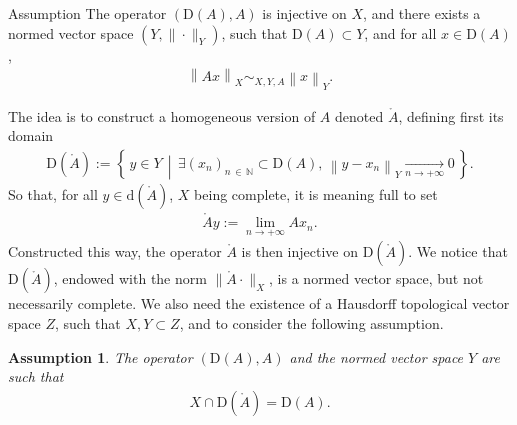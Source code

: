 \documentclass[AHL,Unicode,longabstracts,published]{cedram}
\newcommand{\bbN}{\mathbb{N}}
\newcommand{\rmd}{\mathrm{d}}
\newcommand{\rmD}{\mathrm{D}}
\newcommand{\rgA}{\mathring{A}}
\newtheorem{assu}[cdrthm]{Assumption} }
\let\oldexists\exists
\renewcommand*{\exists}{\mathrel{\oldexists}}
\begin{document}
\begin{enonce}
{Assumption}\label{asmpt:homogeneousdomaindef}
The operator $(\rmD(A),A)$ is injective on $X$, and there exists a normed vector space $(Y, \| \cdot\|_{Y})$, such that $\rmD(A)\subset Y$, and for all $x\in \rmD(A)$,
\begin{align}
\left\| Ax\right\|_{X} \sim_{X,Y,A} \left\| x \right\|_{Y} .
\end{align}
\end{enonce}

The idea is to construct a homogeneous version of $A$ denoted $\rgA$, defining first its domain
\begin{align*}
\rmD(\rgA):= \left\{\, y\in Y\, \middle|\, \exists (x_n)_{n\,\in\,\bbN}\subset \rmD(A),\, \left\| y-x_n\right\|_Y\underset{n\rightarrow +\infty}{\longrightarrow} 0 \,\right\}.
\end{align*}
So that, for all $y\in \rmd(\rgA)$, $X$ being complete, it is meaning full to set
\begin{align*}
\rgA y:= \lim_{n\rightarrow +\infty} Ax_n .
\end{align*}
Constructed this way, the operator $\rgA$ is then injective on $\rmD(\rgA)$. We notice that $\rmD(\rgA)$, endowed with the norm 
$\|\rgA\cdot\|_{X}$, is a normed vector space, but not necessarily complete. We also need the existence of a Hausdorff topological vector space $Z$, such that $X,Y\subset Z$, and to consider the following assumption.

\begin{assu}\label{asmpt:homogeneousdomainintersect}
The operator $(\rmD(A),A)$ and the normed vector space $Y$ are such that
\begin{align}
X\cap\rmD(\rgA) = \rmD({A}) .
\end{align}
\end{assu}
\end{document}
